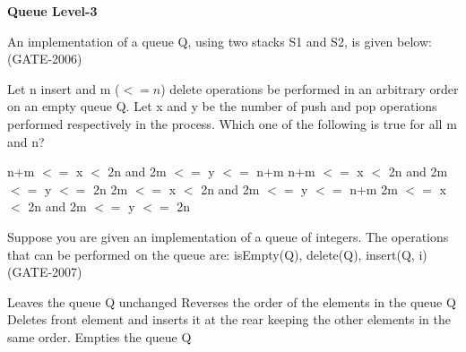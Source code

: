 
\centerline{\textbf{ \LARGE Queue Level-3}}

\begin{questyle}
  \question  An implementation of a queue Q, using two stacks S1 and S2, is given below:  (GATE-2006)
    
    Let n insert and m (\(<=n\)) delete operations be performed in an arbitrary order on an empty queue Q.
    Let x and y be the number of push and pop operations performed respectively in the process.
    Which one of the following is true for all m and n?

  \begin{choices}
    \CorrectChoice  n+m \(<=\) x \(<\) 2n and 2m \(<=\) y \(<=\) n+m
    \choice         n+m \(<=\) x \(<\) 2n and 2m \(<=\) y \(<=\) 2n
    \choice         2m \(<=\) x \(<\) 2n and 2m \(<=\) y \(<=\) n+m
    \choice         2m \(<=\) x \(<\) 2n and 2m \(<=\) y \(<=\) 2n
  \end{choices}
\end{questyle}


\begin{questyle}
  \question  Suppose you are given an implementation of a queue of integers. The operations that can be performed on the queue are:
            isEmpty(Q), delete(Q), insert(Q, i)  (GATE-2007)

            

  \begin{choices}
    \choice         Leaves the queue Q unchanged
    \CorrectChoice  Reverses the order of the elements in the queue Q
    \choice         Deletes front element  and inserts it at the rear keeping the other elements in the same order.
    \choice         Empties the queue Q
  \end{choices}
\end{questyle}

